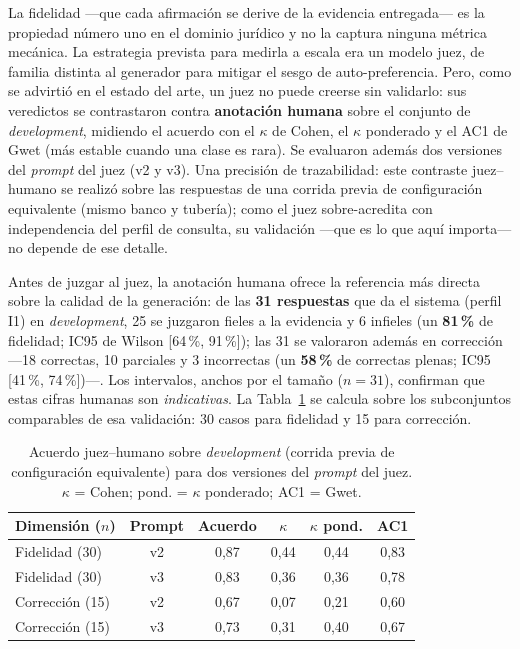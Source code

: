 La fidelidad —que cada afirmación se derive de la evidencia entregada— es la propiedad número uno en el dominio jurídico y no la captura ninguna métrica mecánica. La estrategia prevista para medirla a escala era un modelo juez, de familia distinta al generador para mitigar el sesgo de auto-preferencia. Pero, como se advirtió en el estado del arte, un juez no puede creerse sin validarlo: sus veredictos se contrastaron contra \textbf{anotación humana} sobre el conjunto de \emph{development}, midiendo el acuerdo con el $\kappa$ de Cohen, el $\kappa$ ponderado y el AC1 de Gwet (más estable cuando una clase es rara). Se evaluaron además dos versiones del \emph{prompt} del juez (v2 y v3). Una precisión de trazabilidad: este contraste juez--humano se realizó sobre las respuestas de una corrida previa de configuración equivalente (mismo banco y tubería); como el juez sobre-acredita con independencia del perfil de consulta, su validación —que es lo que aquí importa— no depende de ese detalle.

Antes de juzgar al juez, la anotación humana ofrece la referencia más directa sobre la calidad de la generación: de las \textbf{31 respuestas} que da el sistema (perfil I1) en \emph{development}, 25 se juzgaron fieles a la evidencia y 6 infieles (un \textbf{81\,\%} de fidelidad; IC95 de Wilson [64\,\%, 91\,\%]); las 31 se valoraron además en corrección —18 correctas, 10 parciales y 3 incorrectas (un \textbf{58\,\%} de correctas plenas; IC95 [41\,\%, 74\,\%])—. Los intervalos, anchos por el tamaño ($n=31$), confirman que estas cifras humanas son \emph{indicativas}. La Tabla~\ref{tab:juez-acuerdo} se calcula sobre los subconjuntos comparables de esa validación: 30 casos para fidelidad y 15 para corrección.

\begin{table}[htbp]
    \centering
    \small
    \renewcommand{\arraystretch}{1.2}
    \caption{Acuerdo juez--humano sobre \emph{development} (corrida previa de configuración equivalente) para dos versiones del \emph{prompt} del juez. $\kappa$ = Cohen; pond. = $\kappa$ ponderado; AC1 = Gwet.}
    \label{tab:juez-acuerdo}
    \begin{tabular}{|l|c|c|c|c|c|}
        \hline
        \textbf{Dimensión ($n$)} & \textbf{Prompt} & \textbf{Acuerdo} & \textbf{$\kappa$} & \textbf{$\kappa$ pond.} & \textbf{AC1} \\
        \hline
        Fidelidad (30)  & v2 & 0,87 & 0,44 & 0,44 & 0,83 \\
        Fidelidad (30)  & v3 & 0,83 & 0,36 & 0,36 & 0,78 \\
        Corrección (15) & v2 & 0,67 & 0,07 & 0,21 & 0,60 \\
        Corrección (15) & v3 & 0,73 & 0,31 & 0,40 & 0,67 \\
        \hline
    \end{tabular}
\end{table}

